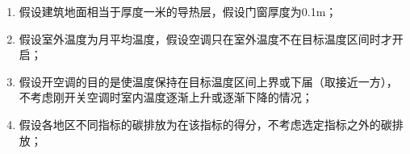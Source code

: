 \documentclass[a4paper, 12pt]{article}
\numberwithin{equation}{section}
\begin{document}
    {}
        \begin{enumerate}
            \item 假设建筑地面相当于厚度一米的导热层，假设门窗厚度为0.1m；
            \item 假设室外温度为月平均温度，假设空调只在室外温度不在目标温度区间时才开启；
            \item 假设开空调的目的是使温度保持在目标温度区间上界或下届（取接近一方），不考虑刚开关空调时室内温度逐渐上升或逐渐下降的情况；
            \item 假设各地区不同指标的碳排放为在该指标的得分，不考虑选定指标之外的碳排放；
        \end{enumerate}
\end{document}
